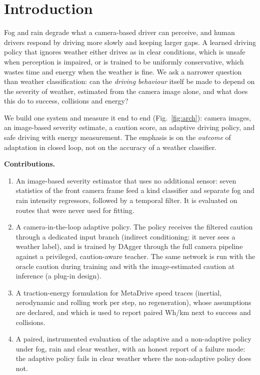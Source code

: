 \documentclass[conference]{IEEEtran}
\begin{document}
\section{Introduction}
Fog and rain degrade what a camera-based driver can perceive, and human drivers respond by driving more slowly and keeping larger gaps. A learned driving policy that ignores weather either drives as in clear conditions, which is unsafe when perception is impaired, or is trained to be uniformly conservative, which wastes time and energy when the weather is fine. We ask a narrower question than weather classification: can the \emph{driving behaviour} itself be made to depend on the severity of weather, estimated from the camera image alone, and what does this do to success, collisions and energy?

We build one system and measure it end to end (Fig.~\ref{fig:arch}): camera images, an image-based severity estimate, a caution score, an adaptive driving policy, and safe driving with energy measurement. The emphasis is on the \emph{outcome} of adaptation in closed loop, not on the accuracy of a weather classifier.

\textbf{Contributions.}
\begin{enumerate}
\item An image-based severity estimator that uses no additional sensor: seven statistics of the front camera frame feed a kind classifier and separate fog and rain intensity regressors, followed by a temporal filter. It is evaluated on routes that were never used for fitting.
\item A camera-in-the-loop adaptive policy. The policy receives the filtered caution through a dedicated input branch (indirect conditioning: it never sees a weather label), and is trained by DAgger through the full camera pipeline against a privileged, caution-aware teacher. The same network is run with the oracle caution during training and with the image-estimated caution at inference (a plug-in design).
\item A traction-energy formulation for MetaDrive speed traces (inertial, aerodynamic and rolling work per step, no regeneration), whose assumptions are declared, and which is used to report paired Wh/km next to success and collisions.
\item A paired, instrumented evaluation of the adaptive and a non-adaptive policy under fog, rain and clear weather, with an honest report of a failure mode: the adaptive policy fails in clear weather where the non-adaptive policy does not.
\end{enumerate}
\end{document}

